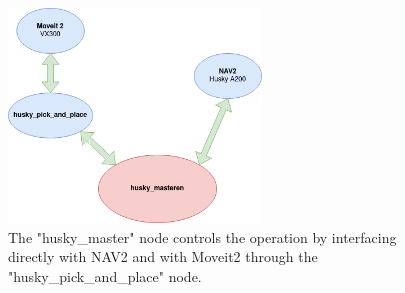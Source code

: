\begin{figure}[H]
  \centering
  \includegraphics[width = 0.6\textwidth]{Figures/software_overview.drawio.png}
  \caption{The "husky\_master" node controls the operation by interfacing directly with NAV2 and with Moveit2 through the "husky\_pick\_and\_place" node.}
  \label{fig:husky_master}
\end{figure}
